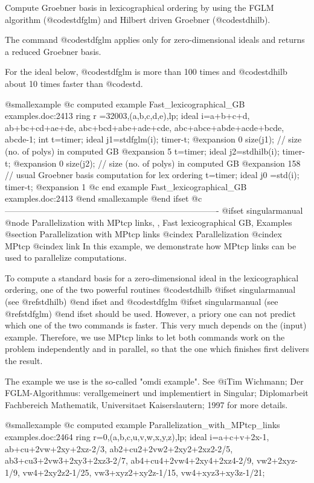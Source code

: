 Compute Groebner basis in lexicographical ordering
by using the FGLM algorithm (@code{stdfglm})
and Hilbert driven Groebner (@code{stdhilb}).

The command @code{stdfglm} applies only for zero-dimensional ideals and
returns a reduced Groebner basis.

For the ideal below, @code{stdfglm} is more than 100 times
and @code{stdhilb} about 10 times faster than @code{std}.

@smallexample
@c computed example Fast_lexicographical_GB examples.doc:2413 
  ring r =32003,(a,b,c,d,e),lp;
  ideal i=a+b+c+d, ab+bc+cd+ae+de, abc+bcd+abe+ade+cde,
          abc+abce+abde+acde+bcde, abcde-1;
  int t=timer;
  ideal j1=stdfglm(i);
  timer-t;
@expansion{} 0
  size(j1);   // size (no. of polys) in computed GB
@expansion{} 5
  t=timer;
  ideal j2=stdhilb(i);
  timer-t;
@expansion{} 0
  size(j2);   // size (no. of polys) in computed GB
@expansion{} 158
  // usual Groebner basis computation for lex ordering
  t=timer;
  ideal j0 =std(i);
  timer-t;
@expansion{} 1
@c end example Fast_lexicographical_GB examples.doc:2413
@end smallexample
@end ifset
@c ----------------------------------------------------------------------------
@ifset singularmanual
@node  Parallelization with MPtcp links,  , Fast lexicographical GB, Examples
@section Parallelization with MPtcp links
@cindex Parallelization
@cindex MPtcp
@cindex link
In this example, we demonstrate how MPtcp links can be used to
parallelize computations.

To compute a standard basis for a zero-dimensional ideal in the
lexicographical ordering, one of the two powerful routines
@code{stdhilb}
@ifset singularmanual
(see @ref{stdhilb})
@end ifset
and @code{stdfglm}
@ifset singularmanual
(see @ref{stdfglm})
@end ifset
should be used. However, a priory one can not predict
which one of the two commands is faster. This very much depends on the
(input) example. Therefore, we use MPtcp links to let both commands
work on the problem independently and in parallel, so that the one which
finishes first delivers the result.

The example we use is the so-called "omdi example". See @i{Tim
Wichmann; Der FGLM-Algorithmus: verallgemeinert und implementiert in
Singular; Diplomarbeit Fachbereich Mathematik, Universitaet
Kaiserslautern; 1997} for more details.

@smallexample
@c computed example Parallelization_with_MPtcp_links examples.doc:2464 
ring r=0,(a,b,c,u,v,w,x,y,z),lp;
ideal i=a+c+v+2x-1, ab+cu+2vw+2xy+2xz-2/3,  ab2+cu2+2vw2+2xy2+2xz2-2/5,
ab3+cu3+2vw3+2xy3+2xz3-2/7, ab4+cu4+2vw4+2xy4+2xz4-2/9, vw2+2xyz-1/9,
vw4+2xy2z2-1/25, vw3+xyz2+xy2z-1/15, vw4+xyz3+xy3z-1/21;

